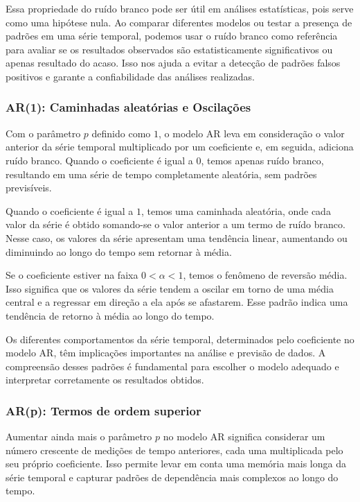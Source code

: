 Essa propriedade do ruído branco pode ser útil em análises estatísticas, pois serve como uma hipótese nula. Ao comparar diferentes modelos ou testar a presença de padrões em uma série temporal, podemos usar o ruído branco como referência para avaliar se os resultados observados são estatisticamente significativos ou apenas resultado do acaso. Isso nos ajuda a evitar a detecção de padrões falsos positivos e garante a confiabilidade das análises realizadas.

\subsubsection{AR(1): Caminhadas aleat\'orias e Oscila\c c\~oes}

Com o parâmetro $p$ definido como $1$, o modelo AR leva em consideração o valor anterior da série temporal multiplicado por um coeficiente e, em seguida, adiciona ruído branco. Quando o coeficiente é igual a $0$, temos apenas ruído branco, resultando em uma série de tempo completamente aleatória, sem padrões previsíveis.

Quando o coeficiente é igual a $1$, temos uma caminhada aleatória, onde cada valor da série é obtido somando-se o valor anterior a um termo de ruído branco. Nesse caso, os valores da série apresentam uma tendência linear, aumentando ou diminuindo ao longo do tempo sem retornar à média.

Se o coeficiente estiver na faixa $0 < \alpha < 1$, temos o fenômeno de reversão média. Isso significa que os valores da série tendem a oscilar em torno de uma média central e a regressar em direção a ela após se afastarem. Esse padrão indica uma tendência de retorno à média ao longo do tempo.

Os diferentes comportamentos da série temporal, determinados pelo coeficiente no modelo AR, têm implicações importantes na análise e previsão de dados. A compreensão desses padrões é fundamental para escolher o modelo adequado e interpretar corretamente os resultados obtidos.

\subsubsection{AR(p): Termos de ordem superior}

Aumentar ainda mais o parâmetro $p$ no modelo AR significa considerar um número crescente de medições de tempo anteriores, cada uma multiplicada pelo seu próprio coeficiente. Isso permite levar em conta uma memória mais longa da série temporal e capturar padrões de dependência mais complexos ao longo do tempo.

